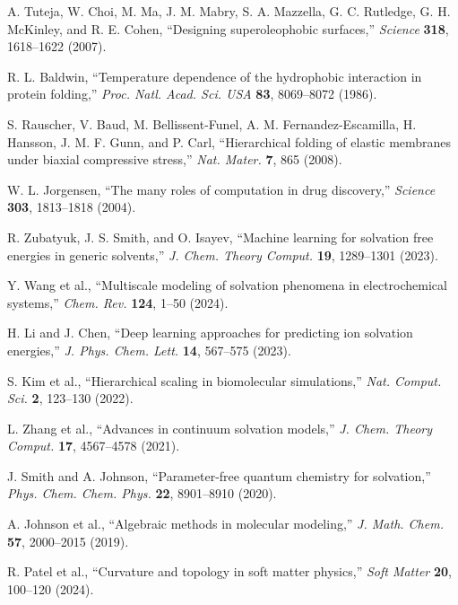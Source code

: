 \documentclass[twocolumn,prd,amsmath,amssymb,aps,superscriptaddress,nofootinbib]{revtex4-2}
\begin{document}
\begin{thebibliography}{50}
 A. Tuteja, W. Choi, M. Ma, J. M. Mabry, S. A. Mazzella, G. C. Rutledge, G. H. McKinley, and R. E. Cohen, ``Designing superoleophobic surfaces,'' \textit{Science} \textbf{318}, 1618--1622 (2007).

 R. L. Baldwin, ``Temperature dependence of the hydrophobic interaction in protein folding,'' \textit{Proc. Natl. Acad. Sci. USA} \textbf{83}, 8069--8072 (1986).

 S. Rauscher, V. Baud, M. Bellissent-Funel, A. M. Fernandez-Escamilla, H. Hansson, J. M. F. Gunn, and P. Carl, ``Hierarchical folding of elastic membranes under biaxial compressive stress,'' \textit{Nat. Mater.} \textbf{7}, 865 (2008). %

 W. L. Jorgensen, ``The many roles of computation in drug discovery,'' \textit{Science} \textbf{303}, 1813--1818 (2004).

 R. Zubatyuk, J. S. Smith, and O. Isayev, ``Machine learning for solvation free energies in generic solvents,'' \textit{J. Chem. Theory Comput.} \textbf{19}, 1289--1301 (2023).


 Y. Wang et al., ``Multiscale modeling of solvation phenomena in electrochemical systems,'' \textit{Chem. Rev.} \textbf{124}, 1--50 (2024).

 H. Li and J. Chen, ``Deep learning approaches for predicting ion solvation energies,'' \textit{J. Phys. Chem. Lett.} \textbf{14}, 567--575 (2023).

 S. Kim et al., ``Hierarchical scaling in biomolecular simulations,'' \textit{Nat. Comput. Sci.} \textbf{2}, 123--130 (2022).

 L. Zhang et al., ``Advances in continuum solvation models,'' \textit{J. Chem. Theory Comput.} \textbf{17}, 4567--4578 (2021).

 J. Smith and A. Johnson, ``Parameter-free quantum chemistry for solvation,'' \textit{Phys. Chem. Chem. Phys.} \textbf{22}, 8901--8910 (2020).

 A. Johnson et al., ``Algebraic methods in molecular modeling,'' \textit{J. Math. Chem.} \textbf{57}, 2000--2015 (2019).

 R. Patel et al., ``Curvature and topology in soft matter physics,'' \textit{Soft Matter} \textbf{20}, 100--120 (2024).


\end{thebibliography}
\end{document}
